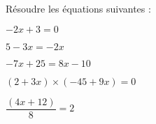 Résoudre les équations suivantes :

\begin{questions}
	
	\question[2] $-2x + 3 = 0$
	
	\fillwithdottedlines{3cm}
	
	\question[2] $5 - 3x = -2x $
	
	\fillwithdottedlines{3cm}
	
	\question[2] $-7x + 25 = 8x - 10$
	
	\fillwithdottedlines{3cm}
	
	\question[2] $(2 + 3x) \times (-45 + 9x) = 0 $
	
	\fillwithdottedlines{3.5cm}
	
	\question[2] $\dfrac{(4x + 12)}{8} = 2$
	
	\fillwithdottedlines{3.5cm}
\end{questions}